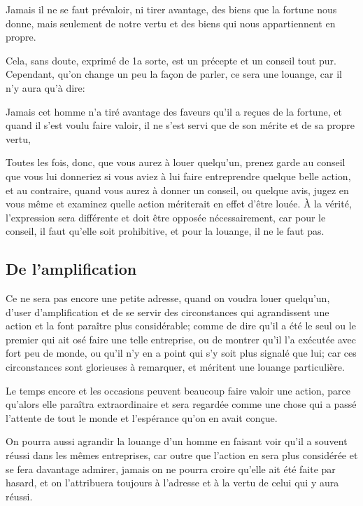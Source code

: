 \begin{emphpar}
	Jamais il ne se faut prévaloir, ni tirer avantage, des biens que la fortune nous donne, mais seulement de
	notre vertu et des biens qui nous appartiennent en propre.
\end{emphpar}

Cela, sans doute, exprimé de 1a sorte, est un précepte et un conseil tout pur. Cependant, qu'on change un peu
la façon de parler, ce sera une louange, car il n'y aura qu'à dire:

\begin{emphpar}
	Jamais cet homme n'a tiré avantage des faveurs qu'il a reçues de la fortune, et quand il s'est voulu faire
	valoir, il ne s'est servi que de son mérite et de sa propre vertu,
\end{emphpar}

Toutes les fois, donc, que vous aurez à louer quelqu'un, prenez garde au conseil que vous lui donneriez si vous
aviez à lui faire entreprendre quelque belle action, et au contraire, quand vous aurez à donner un conseil, ou
quelque avis, jugez en vous même et examinez quelle action mériterait en effet d'être louée. À la vérité, l'expression
sera différente et doit être opposée nécessairement, car pour le conseil, il faut qu'elle soit prohibitive, et
pour la louange, il ne le faut pas.

\subsection{De l'amplification}

Ce ne sera pas encore une petite adresse, quand on voudra louer quelqu'un, d'user d'amplification et de se servir
des circonstances qui agrandissent une action et la font paraître plus considérable; comme de dire qu'il a été le
seul ou le premier qui ait osé faire une telle entreprise, ou de montrer qu'il l'a exécutée avec fort peu de monde,
ou qu'il n'y en a point qui s'y soit plus signalé que lui; car ces circonstances sont glorieuses à remarquer, et
méritent une louange particulière.

\bigbreak

Le temps encore et les occasions peuvent beaucoup faire valoir une action, parce qu'alors elle paraîtra extraordinaire
et sera regardée comme une chose qui a passé l'attente de tout le monde et l'espérance qu'on en avait conçue.

\bigbreak

On pourra aussi agrandir la louange d'un homme en faisant voir qu'il a souvent réussi dans les mêmes entreprises, car
outre que l'action en sera plus considérée et se fera davantage admirer, jamais on ne pourra croire qu'elle ait été
faite par hasard, et on l'attribuera toujours à l'adresse et à la vertu de celui qui y aura réussi.

